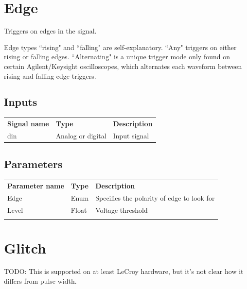 \section{Edge}

Triggers on edges in the signal.

Edge types ``rising" and ``falling" are self-explanatory. ``Any" triggers on either rising or falling edges.
``Alternating" is a unique trigger mode only found on certain Agilent/Keysight oscilloscopes, which alternates each
waveform between rising and falling edge triggers.

\subsection{Inputs}

\begin{tabularx}{16cm}{llX}
\thickhline
\textbf{Signal name} & \textbf{Type} & \textbf{Description} \\
\thickhline
din & Analog or digital & Input signal \\
\end{tabularx}

\subsection{Parameters}

\begin{tabularx}{16cm}{llX}
\thickhline
\textbf{Parameter name} & \textbf{Type} & \textbf{Description} \\
\thickhline
Edge & Enum & Specifies the polarity of edge to look for\\
\thinhline
Level & Float & Voltage threshold\\
\thickhline
\end{tabularx}

\section{Glitch}

TODO: This is supported on at least LeCroy hardware, but it's not clear how it differs from pulse width.



